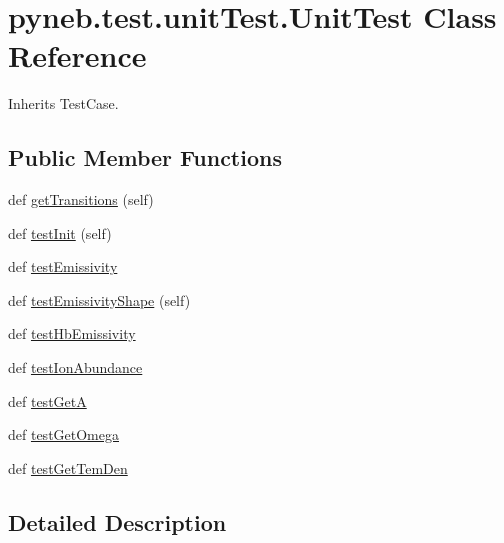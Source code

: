 \hypertarget{classpyneb_1_1test_1_1unit_test_1_1_unit_test}{}\section{pyneb.\+test.\+unit\+Test.\+Unit\+Test Class Reference}
\label{classpyneb_1_1test_1_1unit_test_1_1_unit_test}


Inherits Test\+Case.

\subsection*{Public Member Functions}
\begin{DoxyCompactItemize}
\item 
def \hyperlink{classpyneb_1_1test_1_1unit_test_1_1_unit_test_a6738a3f807de969e8ce8ad1045c4c5a7}{get\+Transitions} (self)
\item 
def \hyperlink{classpyneb_1_1test_1_1unit_test_1_1_unit_test_ab885c3d8c3f2282d4ec88f1ce96f252c}{test\+Init} (self)
\item 
def \hyperlink{classpyneb_1_1test_1_1unit_test_1_1_unit_test_aaf8316a5619d701aaae56fdd26dd167b}{test\+Emissivity}
\item 
def \hyperlink{classpyneb_1_1test_1_1unit_test_1_1_unit_test_ab23d15a37a34d1439ff2854ac602c8d1}{test\+Emissivity\+Shape} (self)
\item 
def \hyperlink{classpyneb_1_1test_1_1unit_test_1_1_unit_test_a2f991eb62fa070893eacc36ce1879004}{test\+Hb\+Emissivity}
\item 
def \hyperlink{classpyneb_1_1test_1_1unit_test_1_1_unit_test_a7a316a645d962527433b1e5b4de4f5ce}{test\+Ion\+Abundance}
\item 
def \hyperlink{classpyneb_1_1test_1_1unit_test_1_1_unit_test_a2aacf1ea25a476599f1e7cf83de571b2}{test\+Get\+A}
\item 
def \hyperlink{classpyneb_1_1test_1_1unit_test_1_1_unit_test_a75cb0860a7a06b129a1028ca635eacf6}{test\+Get\+Omega}
\item 
def \hyperlink{classpyneb_1_1test_1_1unit_test_1_1_unit_test_a8340dae4a77382c9c82c1ce67209d47a}{test\+Get\+Tem\+Den}
\end{DoxyCompactItemize}


\subsection{Detailed Description}



